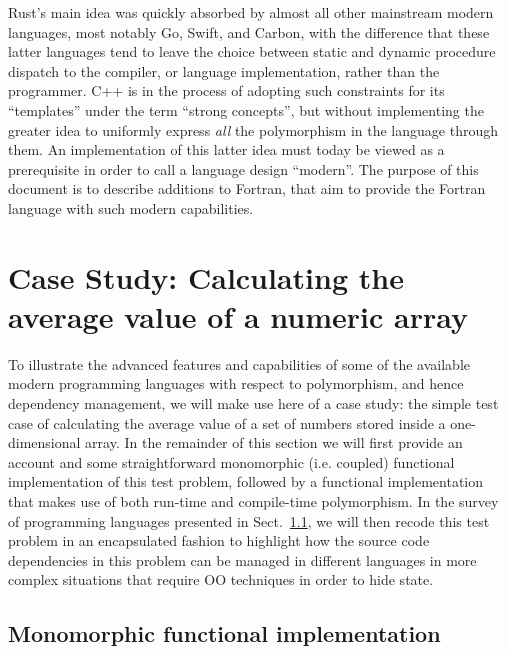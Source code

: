 \documentclass[11pt,oneside]{article}
\begin{document}
Rust's main idea was quickly absorbed by almost all other mainstream
modern languages, most notably Go, Swift, and Carbon, with the
difference that these latter languages tend to leave the choice
between static and dynamic procedure dispatch to the compiler, or
language implementation, rather than the programmer. C++ is in the
process of adopting such constraints for its ``templates'' under the
term ``strong concepts'', but without implementing the greater idea to
uniformly express \emph{all} the polymorphism in the language through
them. An implementation of this latter idea must today be viewed as a
prerequisite in order to call a language design ``modern''. The
purpose of this document is to describe additions to Fortran, that aim
to provide the Fortran language with such modern capabilities.

\newpage

\section{Case Study: Calculating the average value of a numeric array}

To illustrate the advanced features and capabilities of some of the
available modern programming languages with respect to polymorphism,
and hence dependency management, we will make use here of a case
study: the simple test case of calculating the average value of a set
of numbers stored inside a one-dimensional array. In the remainder of
this section we will first provide an account and some straightforward
monomorphic (i.e. coupled) functional implementation of this test
problem, followed by a functional implementation that makes use of
both run-time and compile-time polymorphism. In the survey of
programming languages presented in Sect.~\ref{}, we will then recode
this test problem in an encapsulated fashion to highlight how the
source code dependencies in this problem can be managed in different
languages in more complex situations that require OO techniques in
order to hide state.

\subsection{Monomorphic functional implementation}
\end{document}
